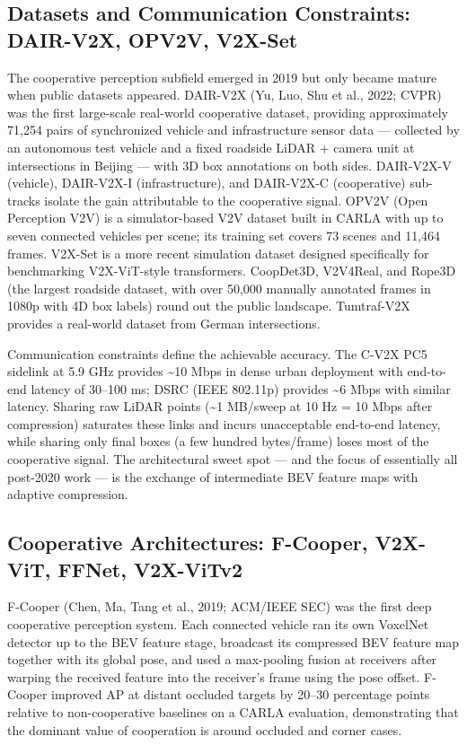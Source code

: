 \subsection{Datasets and Communication Constraints: DAIR-V2X, OPV2V, V2X-Set}\label{datasets-and-communication-constraints-dair-v2x-opv2v-v2x-set}

The cooperative perception subfield emerged in 2019 but only became mature when public datasets appeared. DAIR-V2X (Yu, Luo, Shu et al., 2022; CVPR) was the first large-scale real-world cooperative dataset, providing approximately 71,254 pairs of synchronized vehicle and infrastructure sensor data --- collected by an autonomous test vehicle and a fixed roadside LiDAR + camera unit at intersections in Beijing --- with 3D box annotations on both sides. DAIR-V2X-V (vehicle), DAIR-V2X-I (infrastructure), and DAIR-V2X-C (cooperative) sub-tracks isolate the gain attributable to the cooperative signal. OPV2V (Open Perception V2V) is a simulator-based V2V dataset built in CARLA with up to seven connected vehicles per scene; its training set covers 73 scenes and 11,464 frames. V2X-Set is a more recent simulation dataset designed specifically for benchmarking V2X-ViT-style transformers. CoopDet3D, V2V4Real, and Rope3D (the largest roadside dataset, with over 50,000 manually annotated frames in 1080p with 4D box labels) round out the public landscape. Tumtraf-V2X provides a real-world dataset from German intersections.

Communication constraints define the achievable accuracy. The C-V2X PC5 sidelink at 5.9 GHz provides \textasciitilde10 Mbps in dense urban deployment with end-to-end latency of 30--100 ms; DSRC (IEEE 802.11p) provides \textasciitilde6 Mbps with similar latency. Sharing raw LiDAR points (\textasciitilde1 MB/sweep at 10 Hz = 10 Mbps after compression) saturates these links and incurs unacceptable end-to-end latency, while sharing only final boxes (a few hundred bytes/frame) loses most of the cooperative signal. The architectural sweet spot --- and the focus of essentially all post-2020 work --- is the exchange of intermediate BEV feature maps with adaptive compression.

\subsection{Cooperative Architectures: F-Cooper, V2X-ViT, FFNet, V2X-ViTv2}\label{cooperative-architectures-f-cooper-v2x-vit-ffnet-v2x-vitv2}

F-Cooper (Chen, Ma, Tang et al., 2019; ACM/IEEE SEC) was the first deep cooperative perception system. Each connected vehicle ran its own VoxelNet detector up to the BEV feature stage, broadcast its compressed BEV feature map together with its global pose, and used a max-pooling fusion at receivers after warping the received feature into the receiver's frame using the pose offset. F-Cooper improved AP at distant occluded targets by 20--30 percentage points relative to non-cooperative baselines on a CARLA evaluation, demonstrating that the dominant value of cooperation is around occluded and corner cases.

